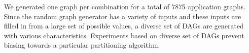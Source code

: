 We generated one graph per combination for a total of 7875 application graphs.
Since the random graph generator has a variety of inputs and these inputs
are filled in from a large set of possible values, a diverse set of DAGs are
generated with various characteristics. Experiments based on diverse set of DAGs
prevent biasing towards a particular partitioning algorithm.



